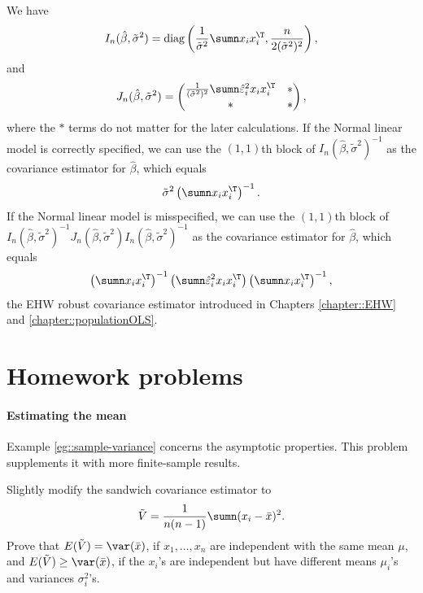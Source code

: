 \begin{example}
We have
$$
I_n(\hat\beta, \tilde\sigma^2 ) = \textup{diag}\left( \frac{1}{  \tilde{\sigma}^2}  \sumn x_i x_i^{\T} , \frac{n}{  2 (\tilde{\sigma}^2)^2 } \right), 
$$
and
$$
J_n(\hat\beta, \tilde\sigma^2 ) = \begin{pmatrix}
\frac{1}{  (\tilde{\sigma}^2)^2 }  \sumn  \hat{\varepsilon}_i^2 x_i x_i^{\T}  & *\\
*&*
\end{pmatrix},
$$
where the $*$ terms do not matter for the later calculations. If the Normal linear model is correctly specified, we can use the $(1,1)$th block of $I_n(\hat\beta, \tilde\sigma^2 )^{-1}$ as the covariance estimator for $\hat{\beta}$, which equals
$$
 \tilde{\sigma}^2  \left( \sumn x_i x_i^{\T} \right)^{-1}.
$$
If the Normal linear model is  misspecified, we can use the $(1,1)$th block of $I_n(\hat\beta, \tilde\sigma^2 )^{-1} J_n(\hat\beta, \tilde\sigma^2 ) I_n(\hat\beta, \tilde\sigma^2 )^{-1}$ as the covariance estimator for $\hat{\beta}$, which equals
$$
\left( \sumn x_i x_i^{\T} \right)^{-1}
\left(   \sumn  \hat{\varepsilon}_i^2 x_i x_i^{\T}  \right) 
\left( \sumn x_i x_i^{\T} \right)^{-1},
$$
the EHW robust covariance estimator introduced in Chapters \ref{chapter::EHW} and \ref{chapter::populationOLS}. 
\end{example}





%
%
%
%




\section{Homework problems}


\paragraph{Estimating the mean}\label{hw-math4::mean}

Example \ref{eg::sample-variance} concerns the asymptotic properties. This problem supplements it with more finite-sample results. 


Slightly modify the sandwich covariance estimator to 
$$
\tilde{V} = \frac{1}{n(n-1)} \sumn (x_i - \bar{x})^2.
$$
Prove that $E(\tilde{V} ) = \var(\bar{x})$, if $x_1,\ldots, x_n$ are independent with the same mean $\mu$, and $E(\tilde{V} ) \geq  \var(\bar{x})$, if the $x_i $'s are independent but have different means $\mu_i$'s and variances $\sigma_i^2$'s. 


